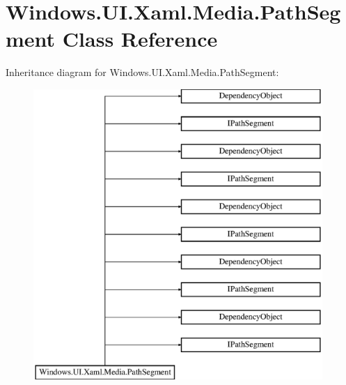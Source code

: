 \hypertarget{class_windows_1_1_u_i_1_1_xaml_1_1_media_1_1_path_segment}{}\section{Windows.\+U\+I.\+Xaml.\+Media.\+Path\+Segment Class Reference}
\label{class_windows_1_1_u_i_1_1_xaml_1_1_media_1_1_path_segment}
Inheritance diagram for Windows.\+U\+I.\+Xaml.\+Media.\+Path\+Segment\+:\begin{figure}[H]
\begin{center}
\leavevmode
\includegraphics[height=11.000000cm]{class_windows_1_1_u_i_1_1_xaml_1_1_media_1_1_path_segment}
\end{center}
\end{figure}
